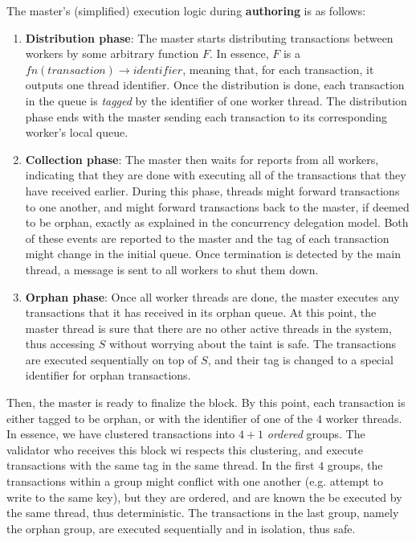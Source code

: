 The master's (simplified) execution logic during \textbf{authoring} is as follows:

\begin{enumerate}
	\item \textbf{Distribution phase}: The master starts distributing transactions between workers
	by some arbitrary function $F$. In essence, $F$ is a $fn(transaction) \rightarrow identifier$,
	meaning that, for each transaction, it outputs one thread identifier. Once the distribution is
	done, each transaction in the queue is \textit{tagged} by the identifier of one worker thread.
	The distribution phase ends with the master sending each transaction to its corresponding
	worker's local queue.

	\item \textbf{Collection phase}: The master then waits for reports from all workers,
	indicating that they are done with executing all of the transactions that they have received
	earlier. During this phase, threads might forward transactions to one another, and might forward
	transactions back to the master, if deemed to be orphan, exactly as explained in the concurrency
	delegation model. Both of these events are reported to the master and the tag of each
	transaction might change in the initial queue. Once termination is detected by the main thread,
	a message is sent to all workers to shut them down.

	\item \textbf{Orphan phase}: Once all worker threads are done, the master executes any
	transactions that it has received in its orphan queue. At this point, the master thread is sure
	that there are no other active threads in the system, thus accessing $S$ without worrying about
	the taint is safe. The transactions are executed sequentially on top of $S$, and their tag is
	changed to a special identifier for orphan transactions.
\end{enumerate}

Then, the master is ready to finalize the block. By this point, each transaction is either tagged to
be orphan, or with the identifier of one of the $4$ worker threads. In essence, we have clustered
transactions into $4 + 1$ \textit{ordered} groups. The validator who receives this block wi
respects this clustering, and execute transactions with the same tag in the same thread. In the first
$4$ groups, the transactions within a group might conflict with one another (e.g. attempt to write
to the same key), but they are ordered, and are known the be executed by the same thread, thus
deterministic. The transactions in the last group, namely the orphan group, are executed
sequentially and in isolation, thus safe.


